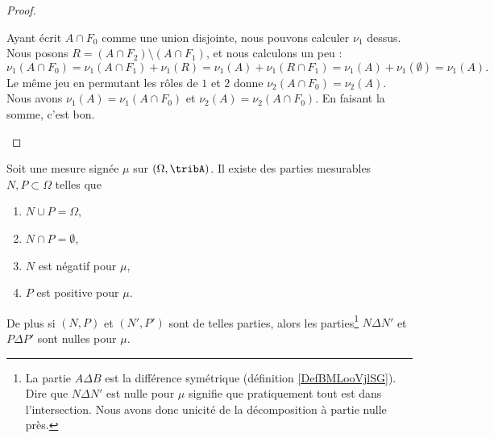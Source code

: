 \begin{proof}
\begin{subproof}
		Ayant écrit \( A\cap F_0\) comme une union disjointe, nous pouvons calculer \( \nu_1\) dessus. Nous posons \( R= (A\cap F_2)\setminus (A\cap F_1) \), et nous calculons un peu :
		\begin{equation}
			\nu_1(A\cap F_0)=\nu_1(A\cap F_1)+\nu_1(R)=\nu_1(A)+\nu_1(R\cap F_1)=\nu_1(A)+\nu_1(\emptyset)=\nu_1(A).
		\end{equation}
		Le même jeu en permutant les rôles de \( 1\) et \( 2\) donne \( \nu_2(A\cap F_0)=\nu_2(A)\).
		\spitem[Conclusion]
		Nous avons \( \nu_1(A)=\nu_1(A\cap F_0)\) et \( \nu_2(A)=\nu_2(A\cap F_0)\). En faisant la somme, c'est bon.
	\end{subproof}
\end{proof}

\begin{proposition}		\label{PROPooIBLHooTMfEJW}
	Soit une mesure signée \( \mu\) sur \( (\Omega,\tribA)\). Il existe des parties mesurables \( N,P\subset \Omega\) telles que
	\begin{enumerate}
		\item
		      \( N\cup P=\Omega\),
		\item
		      \( N\cap P=\emptyset\),
		\item
		      \( N\) est négatif pour \( \mu\),
		\item
		      \( P\) est positive pour \( \mu\).
	\end{enumerate}

	De plus si \( (N,P)\) et \( (N',P')\) sont de telles parties, alors les parties\footnote{La partie \( A\Delta B\) est la différence symétrique (définition \ref{DefBMLooVjlSG}). Dire que \( N\Delta N'\) est nulle pour \( \mu\) signifie que pratiquement tout est dans l'intersection. Nous avons donc unicité de la décomposition à partie nulle près.} \( N\Delta N'\) et \( P\Delta P'\) sont nulles pour \( \mu\).
\end{proposition}

